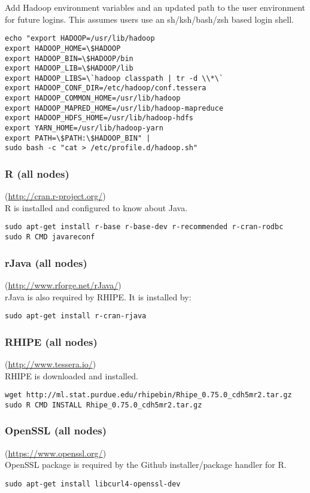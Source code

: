 Add Hadoop environment variables and an updated path to the user environment for future logins.  This assumes users use an sh/ksh/bash/zsh based login shell.
\begin{verbatim}
echo "export HADOOP=/usr/lib/hadoop
export HADOOP_HOME=\$HADOOP	
export HADOOP_BIN=\$HADOOP/bin
export HADOOP_LIB=\$HADOOP/lib
export HADOOP_LIBS=\`hadoop classpath | tr -d \\*\`
export HADOOP_CONF_DIR=/etc/hadoop/conf.tessera
export HADOOP_COMMON_HOME=/usr/lib/hadoop
export HADOOP_MAPRED_HOME=/usr/lib/hadoop-mapreduce
export HADOOP_HDFS_HOME=/usr/lib/hadoop-hdfs
export YARN_HOME=/usr/lib/hadoop-yarn
export PATH=\$PATH:\$HADOOP_BIN" | 
sudo bash -c "cat > /etc/profile.d/hadoop.sh"
\end{verbatim}

\subsubsection{R (all nodes)} (\url{http://cran.r-project.org/})\\
R is installed and configured to know about Java.
\begin{verbatim}
sudo apt-get install r-base r-base-dev r-recommended r-cran-rodbc
sudo R CMD javareconf
\end{verbatim}

\subsubsection{rJava (all nodes)}(\url{http://www.rforge.net/rJava/})\\
rJava is also required by RHIPE.  It is installed by:

\begin{verbatim}
sudo apt-get install r-cran-rjava
\end{verbatim}

\subsubsection{RHIPE (all nodes)}(\url{http://www.tessera.io/})\\
RHIPE is downloaded and installed.
\begin{verbatim}
wget http://ml.stat.purdue.edu/rhipebin/Rhipe_0.75.0_cdh5mr2.tar.gz
sudo R CMD INSTALL Rhipe_0.75.0_cdh5mr2.tar.gz
\end{verbatim}

\subsubsection{OpenSSL (all nodes)}(\url{https://www.openssl.org/})\\
OpenSSL package is required by the Github installer/package handler for R. 
\begin{verbatim}
sudo apt-get install libcurl4-openssl-dev
\end{verbatim}

